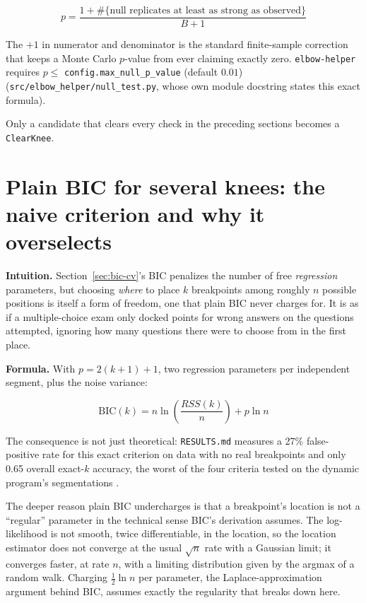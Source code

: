 \documentclass[11pt]{article}
\newcommand{\code}[1]{\texttt{#1}}
\begin{document}
\begin{equation}
p = \frac{1 + \#\{\text{null replicates at least as strong as observed}\}}{B + 1}
\end{equation}

The $+1$ in numerator and denominator is the standard finite-sample
correction that keeps a Monte Carlo $p$-value from ever claiming exactly
zero. \code{elbow-helper} requires $p \le$ \code{config.\allowbreak max\_null\_p\_value}
(default $0.01$) (\code{src/elbow\_helper/\allowbreak null\_test.py}, whose own module
docstring states this exact formula).

Only a candidate that clears every check in the preceding sections becomes
a \code{ClearKnee}.

\section{Plain BIC for several knees: the naive criterion and why it overselects}
\label{sec:several-bic}

\textbf{Intuition.} Section~\ref{sec:bic-cv}'s BIC penalizes the number of
free \emph{regression} parameters, but choosing \emph{where} to place $k$
breakpoints among roughly $n$ possible positions is itself a form of
freedom, one that plain BIC never charges for. It is as if a
multiple-choice exam only docked points for wrong answers on the questions
attempted, ignoring how many questions there were to choose from in the
first place.

\textbf{Formula.} With $p = 2(k+1) + 1$, two regression parameters per
independent segment, plus the noise variance:

\begin{equation}
\mathrm{BIC}(k) = n \ln\!\left(\frac{RSS(k)}{n}\right) + p \ln n
\end{equation}

The consequence is not just theoretical: \code{RESULTS.md} measures a 27\%
false-positive rate for this exact criterion on data with no real
breakpoints and only 0.65 overall exact-$k$ accuracy, the worst of the
four criteria tested on the dynamic program's segmentations
\citep{yao1988} \citep{zhangsiegmund2007}.

The deeper reason plain BIC undercharges is that a breakpoint's location is
not a ``regular'' parameter in the technical sense BIC's derivation
assumes. The log-likelihood is not smooth, twice differentiable, in the
location, so the location estimator does not converge at the usual
$\sqrt n$ rate with a Gaussian limit; it converges faster, at rate $n$, with
a limiting distribution given by the argmax of a random walk. Charging
$\frac{1}{2}\ln n$ per parameter, the Laplace-approximation argument behind
BIC, assumes exactly the regularity that breaks down here.
\end{document}
